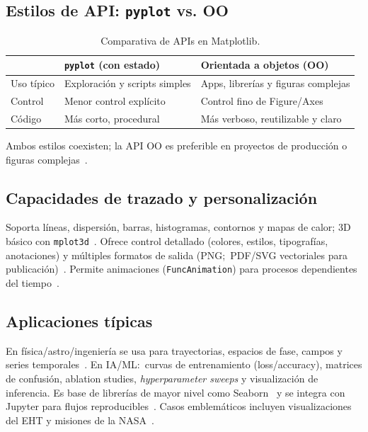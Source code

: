 \subsection{Estilos de API: \texttt{pyplot} vs. OO}%
\label{subsec:estilos_api}
\begin{table}[htbp]
\centering
\caption{Comparativa de APIs en Matplotlib.}%
\label{tab:api_styles}
\begin{tabular}{@{}p{}p{}p{}@{}}
\toprule
 & \textbf{\texttt{pyplot}} (con estado) & \textbf{Orientada a objetos (OO)} \\
\midrule
Uso típico & Exploración y scripts simples & Apps, librerías y figuras complejas \\
Control & Menor control explícito & Control fino de Figure/Axes \\
Código & Más corto, procedural & Más verboso, reutilizable y claro \\
\bottomrule
\end{tabular}
\end{table}
Ambos estilos coexisten; la API OO es preferible en proyectos de producción o figuras complejas~\cite{ActiveStateMatplotlib, MatplotlibDevTeamPyplotTut}.

\subsection{Capacidades de trazado y personalización}%
\label{subsec:caracteristicas_trazado}
Soporta líneas, dispersión, barras, histogramas, contornos y mapas de calor; 3D básico con \texttt{mplot3d}~\cite{VanderPlas2016}. Ofrece control detallado (colores, estilos, tipografías, anotaciones) y múltiples formatos de salida (PNG;\ PDF/SVG vectoriales para publicación)~\cite{GeeksforGeeksIntroMPL, Jones2012Matplotlib, Zhauniarovich2022}. Permite animaciones (\texttt{FuncAnimation}) para procesos dependientes del tiempo~\cite{llegodev2023}.

\subsection{Aplicaciones típicas}%
\label{subsec:aplicaciones}
En física/astro/ingeniería se usa para trayectorias, espacios de fase, campos y series temporales~\cite{VanderPlas2016, Landau2015, RealPythonAstro}. En IA/ML:\ curvas de entrenamiento (loss/accuracy), matrices de confusión, ablation studies, \emph{hyperparameter sweeps} y visualización de inferencia. Es base de librerías de mayor nivel como Seaborn~\cite{Waskom2021} y se integra con Jupyter para flujos reproducibles~\cite{VanderPlas2016, SciPyLecturesEcosystem}. Casos emblemáticos incluyen visualizaciones del EHT y misiones de la NASA~\cite{EHT2019, delftswaMatplotlib}.

